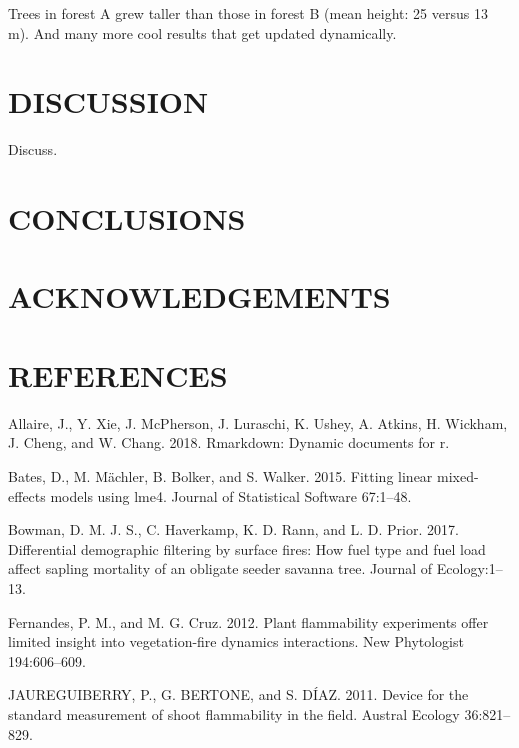 \documentclass[11pt,a4paper]{article}
\begin{document}
Trees in forest A grew taller than those in forest B (mean height: 25
versus 13 m). And many more cool results that get updated dynamically.

\hypertarget{discussion}{%
\section{DISCUSSION}\label{discussion}}

Discuss.

\hypertarget{conclusions}{%
\section{CONCLUSIONS}\label{conclusions}}

\hypertarget{acknowledgements}{%
\section{ACKNOWLEDGEMENTS}\label{acknowledgements}}

\hypertarget{references}{%
\section{REFERENCES}\label{references}}

\hypertarget{refs}{}
\leavevmode\hypertarget{ref-Allaire_2018}{}%
Allaire, J., Y. Xie, J. McPherson, J. Luraschi, K. Ushey, A. Atkins, H.
Wickham, J. Cheng, and W. Chang. 2018. Rmarkdown: Dynamic documents for
r.

\leavevmode\hypertarget{ref-Bates_2015}{}%
Bates, D., M. Mächler, B. Bolker, and S. Walker. 2015. Fitting linear
mixed-effects models using lme4. Journal of Statistical Software
67:1--48.

\leavevmode\hypertarget{ref-Bowman2017}{}%
Bowman, D. M. J. S., C. Haverkamp, K. D. Rann, and L. D. Prior. 2017.
Differential demographic filtering by surface fires: How fuel type and
fuel load affect sapling mortality of an obligate seeder savanna tree.
Journal of Ecology:1--13.

\leavevmode\hypertarget{ref-Fernandes2012}{}%
Fernandes, P. M., and M. G. Cruz. 2012. Plant flammability experiments
offer limited insight into vegetation-fire dynamics interactions. New
Phytologist 194:606--609.

\leavevmode\hypertarget{ref-JAUREGUIBERRY2011}{}%
JAUREGUIBERRY, P., G. BERTONE, and S. DÍAZ. 2011. Device for the
standard measurement of shoot flammability in the field. Austral Ecology
36:821--829.
\end{document}
